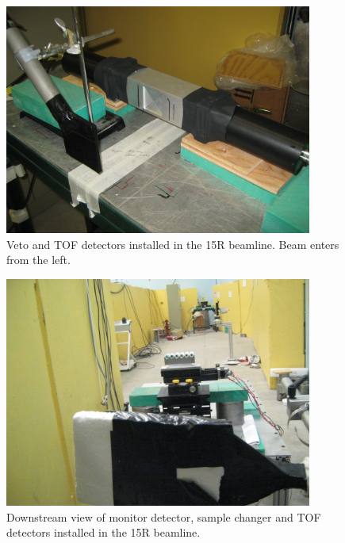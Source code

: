 \begin{figure}[tb]
    \centering
    \includegraphics[width=0.9\textwidth]{figures/VetoAndTOFDetectors.jpg}
    \caption[Veto and TOF detectors installed in the 15R beamline]
    {Veto and TOF detectors installed in the 15R beamline. Beam enters from the left.}
    \label{VetoAndTOFDetectors}
\end{figure}
\begin{figure}[tb]
    \centering
    \includegraphics[width=0.9\textwidth]{figures/DownstreamFromMonitor.jpg}
    \caption[Monitor detector, sample changer, and TOF detector]
    {
        Downstream view of monitor detector, sample changer and TOF detectors
        installed in the 15R beamline.
    }
    \label{BeamlineDownstream}
\end{figure}
